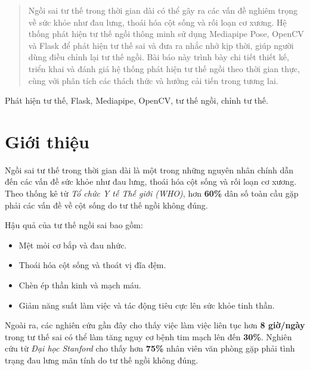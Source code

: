 \documentclass[conference]{IEEEtran}
\begin{document}
\maketitle
\IEEEpeerreviewmaketitle

\begin{abstract}
Ngồi sai tư thế trong thời gian dài có thể gây ra các vấn đề nghiêm trọng về sức khỏe như đau lưng, thoái hóa cột sống và rối loạn cơ xương. Hệ thống phát hiện tư thế ngồi thông minh sử dụng Mediapipe Pose, OpenCV và Flask để phát hiện tư thế sai và đưa ra nhắc nhở kịp thời, giúp người dùng điều chỉnh lại tư thế ngồi. Bài báo này trình bày chi tiết thiết kế, triển khai và đánh giá hệ thống phát hiện tư thế ngồi theo thời gian thực, cùng với phân tích các thách thức và hướng cải tiến trong tương lai.
\end{abstract}

\begin{IEEEkeywords}
Phát hiện tư thế, Flask, Mediapipe, OpenCV, tư thế ngồi, chỉnh tư thế.
\end{IEEEkeywords}

\section{Giới thiệu}
Ngồi sai tư thế trong thời gian dài là một trong những nguyên nhân chính dẫn đến các vấn đề sức khỏe như đau lưng, thoái hóa cột sống và rối loạn cơ xương. Theo thống kê từ \textit{Tổ chức Y tế Thế giới (WHO)}, hơn \textbf{60\%} dân số toàn cầu gặp phải các vấn đề về cột sống do tư thế ngồi không đúng.  

Hậu quả của tư thế ngồi sai bao gồm:
\begin{itemize}
    \item Mệt mỏi cơ bắp và đau nhức.
    \item Thoái hóa cột sống và thoát vị đĩa đệm.
    \item Chèn ép thần kinh và mạch máu.
    \item Giảm năng suất làm việc và tác động tiêu cực lên sức khỏe tinh thần.
\end{itemize}

Ngoài ra, các nghiên cứu gần đây cho thấy việc làm việc liên tục hơn \textbf{8 giờ/ngày} trong tư thế sai có thể làm tăng nguy cơ bệnh tim mạch lên đến \textbf{30\%}. Nghiên cứu từ \textit{Đại học Stanford} cho thấy hơn \textbf{75\%} nhân viên văn phòng gặp phải tình trạng đau lưng mãn tính do tư thế ngồi không đúng.
\end{document}

